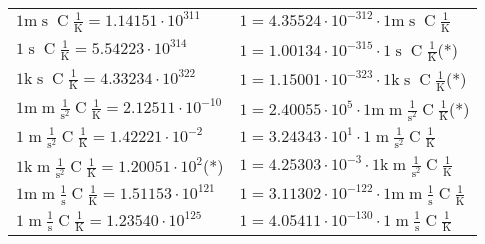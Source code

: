 \begin{center}
\begin{longtable}{l l}
{\color{gray}$1 \bm{\mathrm{ m}}{}{\operatorname{s}}{\operatorname{C}}\frac1{\operatorname{K}} = 1.14151\cdot10^{311} $}   & {\color{gray}$ 1 = 4.35524\cdot10^{-312} \cdot 1 \bm{\mathrm{ m}}{}{\operatorname{s}}{\operatorname{C}}\frac1{\operatorname{K}}$}  \\
{\color{black}$1 \bm{\mathrm{ }}{}{\operatorname{s}}{\operatorname{C}}\frac1{\operatorname{K}} = 5.54223\cdot10^{314} $}   & {\color{black}$ 1 = 1.00134\cdot10^{-315} \cdot 1 \bm{\mathrm{ }}{}{\operatorname{s}}{\operatorname{C}}\frac1{\operatorname{K}}$}\quad(*)\\
{\color{gray}$1 \bm{\mathrm{ k}}{}{\operatorname{s}}{\operatorname{C}}\frac1{\operatorname{K}} = 4.33234\cdot10^{322} $}   & {\color{gray}$ 1 = 1.15001\cdot10^{-323} \cdot 1 \bm{\mathrm{ k}}{}{\operatorname{s}}{\operatorname{C}}\frac1{\operatorname{K}}$}\quad(*)\\
{\color{gray}$1 \bm{\mathrm{ m}}{\operatorname{m}}\frac1{\operatorname{s}^2}{\operatorname{C}}\frac1{\operatorname{K}} = 2.12511\cdot10^{-10} $}   & {\color{gray}$ 1 = 2.40055\cdot10^{5} \cdot 1 \bm{\mathrm{ m}}{\operatorname{m}}\frac1{\operatorname{s}^2}{\operatorname{C}}\frac1{\operatorname{K}}$}\quad(*)\\
{\color{black}$1 \bm{\mathrm{ }}{\operatorname{m}}\frac1{\operatorname{s}^2}{\operatorname{C}}\frac1{\operatorname{K}} = 1.42221\cdot10^{-2} $}   & {\color{black}$ 1 = 3.24343\cdot10^{1} \cdot 1 \bm{\mathrm{ }}{\operatorname{m}}\frac1{\operatorname{s}^2}{\operatorname{C}}\frac1{\operatorname{K}}$}  \\
{\color{gray}$1 \bm{\mathrm{ k}}{\operatorname{m}}\frac1{\operatorname{s}^2}{\operatorname{C}}\frac1{\operatorname{K}} = 1.20051\cdot10^{2} $}\quad(*) & {\color{gray}$ 1 = 4.25303\cdot10^{-3} \cdot 1 \bm{\mathrm{ k}}{\operatorname{m}}\frac1{\operatorname{s}^2}{\operatorname{C}}\frac1{\operatorname{K}}$}  \\
{\color{gray}$1 \bm{\mathrm{ m}}{\operatorname{m}}\frac1{\operatorname{s}}{\operatorname{C}}\frac1{\operatorname{K}} = 1.51153\cdot10^{121} $}   & {\color{gray}$ 1 = 3.11302\cdot10^{-122} \cdot 1 \bm{\mathrm{ m}}{\operatorname{m}}\frac1{\operatorname{s}}{\operatorname{C}}\frac1{\operatorname{K}}$}  \\
{\color{black}$1 \bm{\mathrm{ }}{\operatorname{m}}\frac1{\operatorname{s}}{\operatorname{C}}\frac1{\operatorname{K}} = 1.23540\cdot10^{125} $}   & {\color{black}$ 1 = 4.05411\cdot10^{-130} \cdot 1 \bm{\mathrm{ }}{\operatorname{m}}\frac1{\operatorname{s}}{\operatorname{C}}\frac1{\operatorname{K}}$}  \\

\end{longtable}
\end{center}
